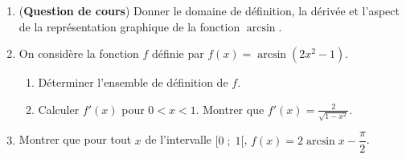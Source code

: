 
\begin{exercice}\label{exoanalyseCTU-0012}

\begin{enumerate}
\item (\textbf{Question de cours}) Donner le domaine de définition, la dérivée et l'aspect de la représentation graphique de la fonction $\arcsin$. 
\item On considère la fonction $f$ définie par $f(x)=\arcsin(2x^2-1)$.
  \begin{enumerate}
  \item Déterminer l'ensemble de définition de $f$.
  \item Calculer $f'(x)$  pour $0<x<1$. Montrer que $\displaystyle f'(x) = \frac{2}{\sqrt{1-x^2}}$.
  \end{enumerate}
\item Montrer que pour tout $x$ de l'intervalle $[0\;;\;1[$, $f(x)=2\arcsin x - \dfrac{\pi}{2}$.
\end{enumerate}


\end{exercice}
